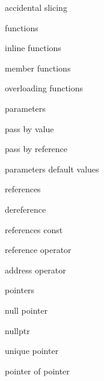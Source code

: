          accidental slicing 
        
         functions
        
         inline functions
        
         member functions

        overloading functions
        
         parameters
        
         pass by value
        
         pass by reference

         parameters default values 
        
         references 
        
         dereference 
        
         references const 
        
         reference operator 
        
         address operator 
        
         pointers
        
         null pointer
        
         nullptr
        
         unique pointer
        
         pointer of pointer
        
